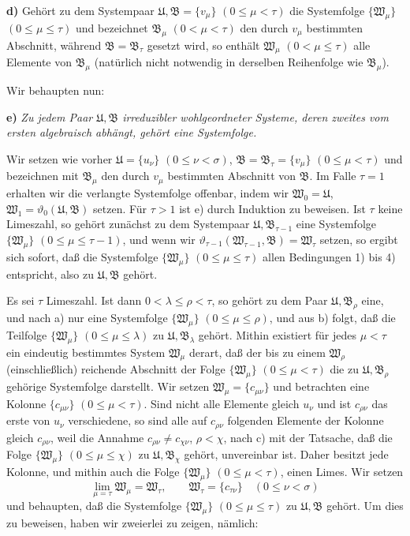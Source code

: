 \textbf{d)} Gehört zu dem Systempaar \(\mathfrak U,\mathfrak B=\{v_\mu\}\) \((0\leq\mu<\tau)\) die Systemfolge \(\{\mathfrak W_\mu\}\) \((0\leq\mu\leq\tau)\) und bezeichnet \(\mathfrak B_\mu\) \((0<\mu<\tau)\) den durch \(v_\mu\) bestimmten Abschnitt, während \(\mathfrak B=\mathfrak B_\tau\) gesetzt wird, so enthält \(\mathfrak W_\mu\) \((0<\mu\leq\tau)\) alle Elemente von \(\mathfrak B_\mu\) (natürlich nicht notwendig in derselben Reihenfolge wie \(\mathfrak B_\mu\)).

Wir behaupten nun:

\textbf{e)} \emph{Zu jedem Paar \(\mathfrak U,\mathfrak B\) irreduzibler wohlgeordneter Systeme, deren zweites vom ersten algebraisch abhängt, gehört eine Systemfolge.}

Wir setzen wie vorher \(\mathfrak U=\{u_\nu\}\) \((0\leq\nu<\sigma)\), \(\mathfrak B=\mathfrak B_\tau=\{v_\mu\}\) \((0\leq\mu<\tau)\) und bezeichnen mit \(\mathfrak B_\mu\) den durch \(v_\mu\) bestimmten Abschnitt von \(\mathfrak B\). Im Falle \(\tau=1\) erhalten wir die verlangte Systemfolge offenbar, indem wir \(\mathfrak W_0=\mathfrak U\), \(\mathfrak W_1=\vartheta_0(\mathfrak U,\mathfrak B)\) setzen. Für \(\tau>1\) ist e) durch Induktion zu beweisen. Ist \(\tau\) keine Limeszahl, so gehört zunächst zu dem Systempaar \(\mathfrak U,\mathfrak B_{\tau-1}\) eine Systemfolge \(\{\mathfrak W_\mu\}\) \((0\leq\mu\leq\tau-1)\), und wenn wir \(\vartheta_{\tau-1}(\mathfrak W_{\tau-1},\mathfrak B)=\mathfrak W_\tau\) setzen, so ergibt sich sofort, daß die Systemfolge \(\{\mathfrak W_\mu\}\) \((0\leq\mu\leq\tau)\) allen Bedingungen 1) bis 4) entspricht, also zu \(\mathfrak U,\mathfrak B\) gehört.

Es sei \(\tau\) Limeszahl. Ist dann \(0<\lambda\leq\rho<\tau\), so gehört zu dem Paar \(\mathfrak U,\mathfrak B_\rho\) eine, und nach a) nur eine Systemfolge \(\{\mathfrak W_\mu\}\) \((0\leq\mu\leq\rho)\), und aus b) folgt, daß die Teilfolge \(\{\mathfrak W_\mu\}\) \((0\leq\mu\leq\lambda)\) zu \(\mathfrak U,\mathfrak B_\lambda\) gehört. Mithin existiert für jedes \(\mu<\tau\) ein eindeutig bestimmtes System \(\mathfrak W_\mu\) derart, daß der bis zu einem \(\mathfrak W_\rho\) (einschließlich) reichende Abschnitt der Folge \(\{\mathfrak W_\mu\}\) \((0\leq\mu<\tau)\) die zu \(\mathfrak U,\mathfrak B_\rho\) gehörige Systemfolge darstellt. Wir setzen \(\mathfrak W_\mu=\{c_{\mu\nu}\}\) und betrachten eine Kolonne \(\{c_{\mu\nu}\}\) \((0\leq\mu<\tau)\). Sind nicht alle Elemente gleich \(u_\nu\) und ist \(c_{\rho\nu}\) das erste von \(u_\nu\) verschiedene, so sind alle auf \(c_{\rho\nu}\) folgenden Elemente der Kolonne gleich \(c_{\rho\nu}\), weil die Annahme \(c_{\rho\nu}\neq c_{\chi\nu}\), \(\rho<\chi\), nach c) mit der Tatsache, daß die Folge \(\{\mathfrak W_\mu\}\) \((0\leq\mu\leq\chi)\) zu \(\mathfrak U,\mathfrak B_\chi\) gehört, unvereinbar ist. Daher besitzt jede Kolonne, und mithin auch die Folge \(\{\mathfrak W_\mu\}\) \((0\leq\mu<\tau)\), einen Limes. Wir setzen
\[
\lim_{\mu=\tau}\mathfrak W_\mu=\mathfrak W_\tau,
\qquad
\mathfrak W_\tau=\{c_{\tau\nu}\}\quad(0\leq\nu<\sigma)
\]
und behaupten, daß die Systemfolge \(\{\mathfrak W_\mu\}\) \((0\leq\mu\leq\tau)\) zu \(\mathfrak U,\mathfrak B\) gehört. Um dies zu beweisen, haben wir zweierlei zu zeigen, nämlich:

